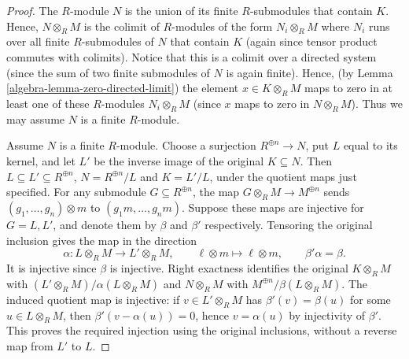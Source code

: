 \begin{proof}
\medskip\noindent
The $R$-module $N$ is the union of its finite
$R$-submodules that contain $K$. Hence, $N \otimes_R M$
is the colimit of $R$-modules of the form
$N_i \otimes_R M$ where $N_i$ runs over all finite
$R$-submodules of $N$ that contain $K$
(again since tensor product commutes with colimits).
Notice that this is a colimit over a directed system
(since the sum of two finite submodules of $N$ is
again finite).
Hence, (by Lemma \ref{algebra-lemma-zero-directed-limit})
the element $x \in K \otimes_R M$ maps to
zero in at least one of these $R$-modules
$N_i \otimes_R M$ (since $x$ maps to zero
in $N \otimes_R M$).
Thus we may assume $N$ is a finite $R$-module.

\medskip\noindent
Assume $N$ is a finite $R$-module. Choose a surjection
$R^{\oplus n}\to N$, put $L$ equal to its kernel, and let
$L'$ be the inverse image of the original $K\subseteq N$.
Then $L\subseteq L'\subseteq R^{\oplus n}$,
$N=R^{\oplus n}/L$ and $K=L'/L$, under the quotient maps
just specified. For any submodule $G\subseteq R^{\oplus n}$,
the map $G\otimes_R M\to M^{\oplus n}$ sends
$(g_1,\ldots,g_n)\otimes m$ to $(g_1m,\ldots,g_nm)$.
Suppose these maps are injective for $G=L,L'$, and denote
them by $\beta$ and $\beta'$ respectively. Tensoring the
original inclusion gives the map in the direction
$$
\alpha:L\otimes_R M\longrightarrow L'\otimes_R M,
\qquad \ell\otimes m\longmapsto\ell\otimes m,
\qquad \beta'\alpha=\beta.
$$
It is injective since $\beta$ is injective. Right exactness
identifies the original $K\otimes_R M$ with
$(L'\otimes_R M)/\alpha(L\otimes_R M)$ and $N\otimes_R M$
with $M^{\oplus n}/\beta(L\otimes_R M)$.
The induced quotient map is injective: if
$v\in L'\otimes_R M$ has $\beta'(v)=\beta(u)$ for some
$u\in L\otimes_R M$, then
$\beta'(v-\alpha(u))=0$, hence $v=\alpha(u)$ by injectivity
of $\beta'$. This proves the required injection using the
original inclusions, without a reverse map from $L'$ to $L$.


\end{proof}
